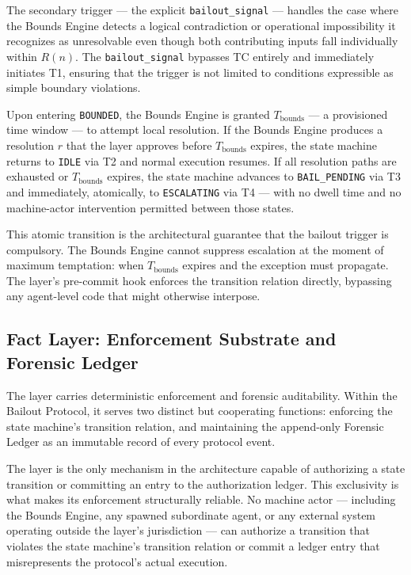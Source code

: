 The secondary trigger — the explicit \texttt{bailout\_signal} — handles the case where the Bounds Engine detects a logical contradiction or operational impossibility it recognizes as unresolvable even though both contributing inputs fall individually within $R(n)$. The \texttt{bailout\_signal} bypasses TC entirely and immediately initiates T1, ensuring that the trigger is not limited to conditions expressible as simple boundary violations.

Upon entering \texttt{BOUNDED}, the Bounds Engine is granted $T_{\mathrm{bounds}}$ — a provisioned time window — to attempt local resolution. If the Bounds Engine produces a resolution $r$ that the \fact{} layer approves before $T_{\mathrm{bounds}}$ expires, the state machine returns to \texttt{IDLE} via T2 and normal execution resumes. If all resolution paths are exhausted or $T_{\mathrm{bounds}}$ expires, the state machine advances to \texttt{BAIL\_PENDING} via T3 and immediately, atomically, to \texttt{ESCALATING} via T4 — with no dwell time and no machine-actor intervention permitted between those states.

This atomic transition is the architectural guarantee that the bailout trigger is compulsory. The Bounds Engine cannot suppress escalation at the moment of maximum temptation: when $T_{\mathrm{bounds}}$ expires and the exception must propagate. The \fact{} layer's pre-commit hook enforces the transition relation directly, bypassing any agent-level code that might otherwise interpose.

\subsection{Fact Layer: Enforcement Substrate and Forensic Ledger}\label{sec:fact-layer}

The \fact{} layer carries deterministic enforcement and forensic auditability. Within the Bailout Protocol, it serves two distinct but cooperating functions: enforcing the state machine's transition relation, and maintaining the append-only Forensic Ledger as an immutable record of every protocol event.

The \fact{} layer is the only mechanism in the \bxthree{} architecture capable of authorizing a state transition or committing an entry to the authorization ledger. This exclusivity is what makes its enforcement structurally reliable. No machine actor — including the Bounds Engine, any spawned subordinate agent, or any external system operating outside the \fact{} layer's jurisdiction — can authorize a transition that violates the state machine's transition relation or commit a ledger entry that misrepresents the protocol's actual execution.

